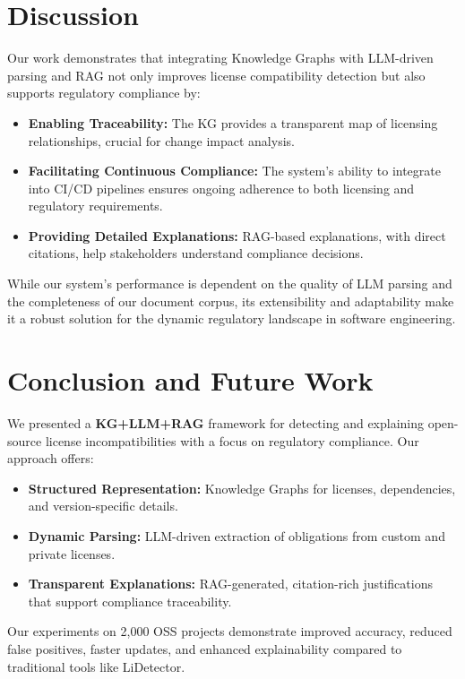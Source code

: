 \documentclass[12pt]{article}
\begin{document}
\section{Discussion}
\label{sec:discussion}
Our work demonstrates that integrating Knowledge Graphs with LLM-driven parsing and RAG not only improves license compatibility detection but also supports regulatory compliance by:
\begin{itemize}
    \item \textbf{Enabling Traceability:} The KG provides a transparent map of licensing relationships, crucial for change impact analysis.
    \item \textbf{Facilitating Continuous Compliance:} The system's ability to integrate into CI/CD pipelines ensures ongoing adherence to both licensing and regulatory requirements.
    \item \textbf{Providing Detailed Explanations:} RAG-based explanations, with direct citations, help stakeholders understand compliance decisions.
\end{itemize}

\noindent
While our system's performance is dependent on the quality of LLM parsing and the completeness of our document corpus, its extensibility and adaptability make it a robust solution for the dynamic regulatory landscape in software engineering.

\section{Conclusion and Future Work}
\label{sec:conclusion}
We presented a \textbf{KG+LLM+RAG} framework for detecting and explaining open-source license incompatibilities with a focus on regulatory compliance. Our approach offers:
\begin{itemize}
    \item \textbf{Structured Representation:} Knowledge Graphs for licenses, dependencies, and version-specific details.
    \item \textbf{Dynamic Parsing:} LLM-driven extraction of obligations from custom and private licenses.
    \item \textbf{Transparent Explanations:} RAG-generated, citation-rich justifications that support compliance traceability.
\end{itemize}
Our experiments on 2,000 OSS projects demonstrate improved accuracy, reduced false positives, faster updates, and enhanced explainability compared to traditional tools like LiDetector.
\end{document}
